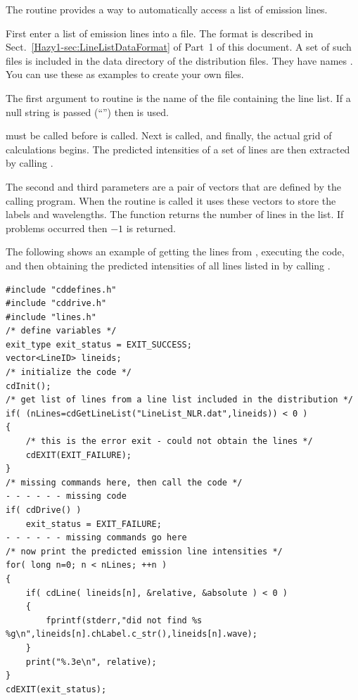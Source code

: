 The routine  provides a way
to automatically access a list of emission lines.

First enter a list of emission lines into a file.
The format is described in Sect.~\ref{Hazy1-sec:LineListDataFormat} of Part~1 of this document.
A set of such files is included
in the data directory of the distribution files.  They have names
.  You can use these as examples to create your own files.

The first argument to routine  is the name of the file
containing the line list.  If a null string is passed (``'') then
 is used.

 must be called before  is called.
Next 
is called, and finally, the actual grid of calculations begins.  The
predicted intensities of a set of lines are then extracted by calling
.

The second and third parameters are a pair of vectors that are defined
by the calling program.
When the routine  is called it uses these
vectors to store the labels and wavelengths.  The function returns
the number of lines in the list.  If problems occurred then $-1$ is returned.

The following shows an example of getting the lines from
,
executing the code, and then obtaining the predicted intensities of all
lines listed in 
by calling .
\begin{verbatim}
#include "cddefines.h"
#include "cddrive.h"
#include "lines.h"
/* define variables */
exit_type exit_status = EXIT_SUCCESS;
vector<LineID> lineids;
/* initialize the code */
cdInit();
/* get list of lines from a line list included in the distribution */
if( (nLines=cdGetLineList("LineList_NLR.dat",lineids)) < 0 )
{
    /* this is the error exit - could not obtain the lines */
    cdEXIT(EXIT_FAILURE);
}
/* missing commands here, then call the code */
- - - - - - missing code
if( cdDrive() )
    exit_status = EXIT_FAILURE;
- - - - - - missing commands go here
/* now print the predicted emission line intensities */
for( long n=0; n < nLines; ++n )
{
    if( cdLine( lineids[n], &relative, &absolute ) < 0 )
    {
        fprintf(stderr,"did not find %s %g\n",lineids[n].chLabel.c_str(),lineids[n].wave);
    }
    print("%.3e\n", relative);
}
cdEXIT(exit_status);
\end{verbatim}

